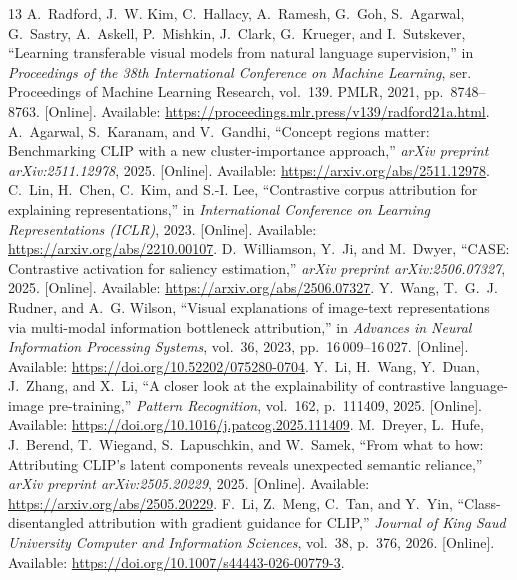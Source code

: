 \begin{thebibliography}{13}
A.~Radford, J.~W. Kim, C.~Hallacy, A.~Ramesh, G.~Goh, S.~Agarwal, G.~Sastry,
A.~Askell, P.~Mishkin, J.~Clark, G.~Krueger, and I.~Sutskever, ``Learning
transferable visual models from natural language supervision,'' in
\emph{Proceedings of the 38th International Conference on Machine Learning},
ser. Proceedings of Machine Learning Research, vol.~139. PMLR, 2021,
pp.~8748--8763. [Online]. Available:
\url{https://proceedings.mlr.press/v139/radford21a.html}.
A.~Agarwal, S.~Karanam, and V.~Gandhi, ``Concept regions matter: Benchmarking
{CLIP} with a new cluster-importance approach,'' \emph{arXiv preprint arXiv:2511.12978},
2025. [Online]. Available:
\url{https://arxiv.org/abs/2511.12978}.
C.~Lin, H.~Chen, C.~Kim, and S.-I. Lee, ``Contrastive corpus attribution for
explaining representations,'' in \emph{International Conference on Learning
Representations (ICLR)}, 2023. [Online]. Available:
\url{https://arxiv.org/abs/2210.00107}.
D.~Williamson, Y.~Ji, and M.~Dwyer, ``{CASE}: Contrastive activation for saliency
estimation,'' \emph{arXiv preprint arXiv:2506.07327}, 2025. [Online]. Available:
\url{https://arxiv.org/abs/2506.07327}.
Y.~Wang, T.~G.~J. Rudner, and A.~G. Wilson, ``Visual explanations of image-text
representations via multi-modal information bottleneck attribution,'' in
\emph{Advances in Neural Information Processing Systems}, vol.~36, 2023,
pp.~16\,009--16\,027. [Online]. Available:
\url{https://doi.org/10.52202/075280-0704}.
Y.~Li, H.~Wang, Y.~Duan, J.~Zhang, and X.~Li, ``A closer look at the explainability
of contrastive language-image pre-training,'' \emph{Pattern Recognition},
vol.~162, p.~111409, 2025. [Online]. Available:
\url{https://doi.org/10.1016/j.patcog.2025.111409}.
M.~Dreyer, L.~Hufe, J.~Berend, T.~Wiegand, S.~Lapuschkin, and W.~Samek, ``From
what to how: Attributing {CLIP}'s latent components reveals unexpected semantic
reliance,'' \emph{arXiv preprint arXiv:2505.20229}, 2025. [Online]. Available:
\url{https://arxiv.org/abs/2505.20229}.
F.~Li, Z.~Meng, C.~Tan, and Y.~Yin, ``Class-disentangled attribution with gradient
guidance for {CLIP},'' \emph{Journal of King Saud University Computer and
Information Sciences}, vol.~38, p.~376, 2026. [Online]. Available:
\url{https://doi.org/10.1007/s44443-026-00779-3}.

\end{thebibliography}
